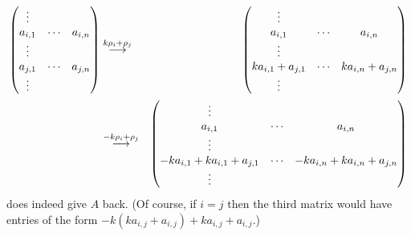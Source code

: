\begin{exercises}
\begin{answer}
\begin{exparts}
\begin{eqnarray*}
          \begin{pmatrix}
            \vdots                     \\
            a_{i,1}  &\cdots  &a_{i,n}  \\
            \vdots                     \\
            a_{j,1}  &\cdots  &a_{j,n}  \\
            \vdots                     
          \end{pmatrix}
          &\mathrel{ \mathop{\longrightarrow}\limits^{k\rho_i+\rho_j\mathstrut}_{ \begin{subarray}{l} \relax \end{subarray}}}
          &\begin{pmatrix}
            \vdots                                      \\
            a_{i,1}           &\cdots  &a_{i,n}          \\
            \vdots                                      \\
            ka_{i,1}+a_{j,1}  &\cdots  &ka_{i,n}+a_{j,n}  \\
            \vdots                     
          \end{pmatrix}                                        \\
          &\mathrel{ \mathop{\longrightarrow}\limits^{-k\rho_i+\rho_j\mathstrut}_{ \begin{subarray}{l} \relax \end{subarray}}}
          &\begin{pmatrix}
            \vdots                                      \\
            a_{i,1}           &\cdots  &a_{i,n}          \\
            \vdots                                      \\
            -ka_{i,1}+ka_{i,1}+a_{j,1}  &\cdots &-ka_{i,n}+ka_{i,n}+a_{j,n} \\
            \vdots                     
          \end{pmatrix}
        \end{eqnarray*}
        does indeed give $A$ back.
        (Of course, if $i=j$ then the third matrix would have entries of the 
        form $-k(ka_{i,j}+a_{i,j})+ka_{i,j}+a_{i,j}$.)
    \end{exparts}
   \end{answer}
\end{exercises}




















